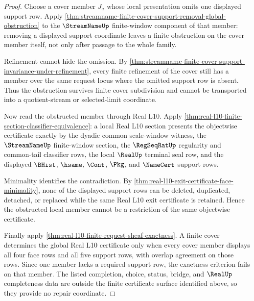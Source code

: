 \begin{proof}
Choose a cover member $J_a$ whose local presentation omits one displayed support row. Apply \autoref{thm:streamname-finite-cover-support-removal-global-obstruction} to the $\StreamNameUp$ finite-window component of that member: removing a displayed support coordinate leaves a finite obstruction on the cover member itself, not only after passage to the whole family.

Refinement cannot hide the omission. By \autoref{thm:streamname-finite-cover-support-invariance-under-refinement}, every finite refinement of the cover still has a member over the same request locus where the omitted support row is absent. Thus the obstruction survives finite cover subdivision and cannot be transported into a quotient-stream or selected-limit coordinate.

Now read the obstructed member through Real L10. Apply \autoref{thm:real-l10-finite-section-classifier-equivalence}: a local Real L10 section presents the objectwise certificate exactly by the dyadic common scale-window witness, the $\StreamNameUp$ finite-window section, the $\RegSeqRatUp$ regularity and common-tail classifier rows, the local $\RealUp$ terminal seal row, and the displayed $\BHist$, $\hsame$, $\Cont$, $\Pkg$, and $\NameCert$ support rows.

Minimality identifies the contradiction. By \autoref{thm:real-l10-exit-certificate-face-minimality}, none of the displayed support rows can be deleted, duplicated, detached, or replaced while the same Real L10 exit certificate is retained. Hence the obstructed local member cannot be a restriction of the same objectwise certificate.

Finally apply \autoref{thm:real-l10-finite-request-sheaf-exactness}. A finite cover determines the global Real L10 certificate only when every cover member displays all four face rows and all five support rows, with overlap agreement on those rows. Since one member lacks a required support row, the exactness criterion fails on that member. The listed completion, choice, status, bridge, and $\RealUp$ completeness data are outside the finite certificate surface identified above, so they provide no repair coordinate.
\end{proof}

